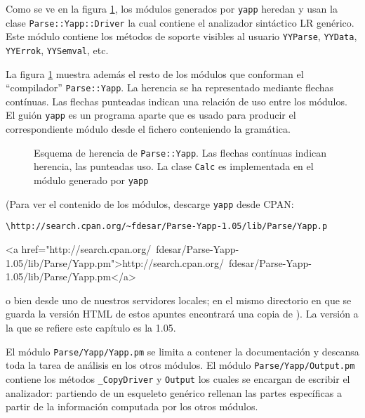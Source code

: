 Como se ve en la figura \ref{fig:yappinheritance}, 
los módulos generados por \verb|yapp|
heredan y usan la clase \verb|Parse::Yapp::Driver|
la  cual contiene el analizador sintáctico LR genérico.
Este módulo contiene los métodos de soporte visibles
al usuario \verb|YYParse|, \verb|YYData|, \verb|YYErrok|, \verb|YYSemval|,
etc.

La figura \ref{fig:yappinheritance} muestra además el 
resto de los módulos
que conforman el ``compilador'' \verb|Parse::Yapp|.
La herencia se ha representado mediante flechas contínuas.
Las flechas punteadas indican una relación de uso entre los módulos.
El guión \verb|yapp| es un programa aparte que es
usado para producir el correspondiente
módulo desde el fichero conteniendo la gramática.

\begin{figure}[htb]
\caption{Esquema de herencia de {\tt Parse::Yapp}. 
Las flechas contínuas indican herencia, las punteadas uso.
La clase {\tt Calc} es implementada en el módulo generado por {\tt yapp}}
\label{fig:yappinheritance}
\end{figure}

(Para ver el contenido de los módulos, descarge \verb|yapp| desde CPAN:
\begin{latexonly}
\begin{verbatim}
\http://search.cpan.org/~fdesar/Parse-Yapp-1.05/lib/Parse/Yapp.p
\end{verbatim}
\end{latexonly}

\begin{rawhtml}
<a href="http://search.cpan.org/~fdesar/Parse-Yapp-1.05/lib/Parse/Yapp.pm">http://search.cpan.org/~fdesar/Parse-Yapp-1.05/lib/Parse/Yapp.pm</a> 
\end{rawhtml}
o bien desde uno de nuestros servidores locales; en 
el mismo directorio en que se guarda la
versión HTML de estos apuntes encontrará una copia de 
).
La versión a la que se refiere este capítulo es la 1.05.

El módulo \verb|Parse/Yapp/Yapp.pm| se limita a contener la documentación
y descansa toda la tarea de análisis en los otros módulos.
El módulo \verb|Parse/Yapp/Output.pm| contiene los métodos
\verb|_CopyDriver| y \verb|Output| los cuales se encargan de escribir
el analizador: partiendo de un esqueleto genérico rellenan 
las partes específicas a partir de la información computada
por los otros módulos. 


